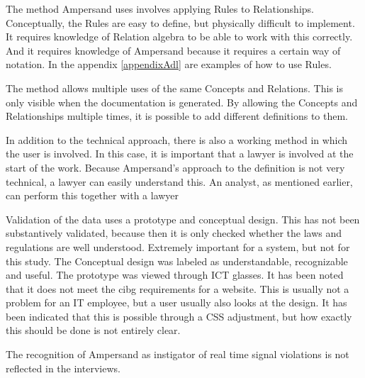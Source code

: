 The method Ampersand uses involves applying Rules to Relationships.
Conceptually, the Rules are easy to define, but physically difficult to implement.
It requires knowledge of Relation algebra to be able to work with this correctly.
And it requires knowledge of Ampersand because it requires a certain way of notation.
In the appendix \ref{appendixAdl} are examples of how to use Rules.

The method allows multiple uses of the same Concepts and Relations.
This is only visible when the documentation is generated.
By allowing the Concepts and Relationships multiple times, it is possible to add different definitions to them.

In addition to the technical approach, there is also a working method in which the user is involved.
In this case, it is important that a lawyer is involved at the start of the work.
Because Ampersand's approach to the definition is not very technical, a lawyer can easily understand this.
An analyst, as mentioned earlier, can perform this together with a lawyer

Validation of the data uses a prototype and conceptual design.
This has not been substantively validated, because then it is only checked whether the laws and regulations are well understood.
Extremely important for a system, but not for this study.
The Conceptual design was labeled as understandable, recognizable and useful.
The prototype was viewed through ICT glasses.
It has been noted that it does not meet the \acrshort{cibg} requirements for a website.
This is usually not a problem for an IT employee, but a user usually also looks at the design.
It has been indicated that this is possible through a CSS adjustment, but how exactly this should be done is not entirely clear.

The recognition of Ampersand as instigator of real time signal violations is not reflected in the interviews.

